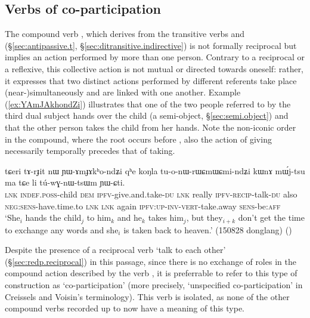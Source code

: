 \subsection{Verbs of co-participation} \label{sec:co.participation} 
The compound verb , which derives from the transitive verbs  and  (§\ref{sec:antipassive.t}, §\ref{sec:ditransitive.indirective}) is not formally reciprocal but implies an action performed by more than one person. Contrary to a reciprocal or a reflexive, this collective action is not mutual or directed towards oneself: rather, it expresses that two distinct actions performed by different referents take place (near-)simultaneously and are linked with one another. Example (\ref{ex:YAmJAkhondZi}) illustrates that one of the two people referred to by the third dual subject hands over the child (a semi-object, §\ref{sec:semi.object}) and that the other person takes the child from her hands. Note the non-iconic order in the compound, where  the root  occurs before , also the action of giving necessarily temporally precedes that of taking.

\begin{exe}
\ex \label{ex:YAmJAkhondZi}
\gll  tɕeri tɤ-rɟit nɯ ɲɯ-ɤmɟɤkʰo-ndʑi qʰe koŋla tu-o-nɯ-rɯɕmɯ\redp{}ɕmi-ndʑi kɯnɤ mɯ́j-tsu ma tɕe li tú-wɣ-nɯ-tsɯm ɲɯ-ɕti. \\
\textsc{lnk} \textsc{indef}.\textsc{poss}-child \textsc{dem} \textsc{ipfv}-give.and.take-\textsc{du} \textsc{lnk} really \textsc{ipfv}-\textsc{recip}-talk-\textsc{du} also \textsc{neg}:\textsc{sens}-have.time.to \textsc{lnk} \textsc{lnk} again \textsc{ipfv}:\textsc{up}-\textsc{inv}-\textsc{vert}-take.away \textsc{sens}-be:\textsc{aff} \\
\glt `She$_i$ hands the child$_j$ to him$_k$ and he$_k$ takes him$_j$, but they$_{i+k}$ don't get the time to exchange any words and she$_i$ is taken back to heaven.' (150828 donglang)
()
\end{exe}

Despite the presence of a reciprocal verb  `talk to each other' (§\ref{sec:redp.reciprocal}) in this passage, since there is no exchange of roles in the compound action described by the verb , it is preferrable to refer to this type of construction as `co-participation' (more precisely, `unspecified co-participation' in Creissels and Voisin's \citeyear{creissels08coparticipation} terminology). This verb is isolated, as none of the other compound verbs recorded up to now have a meaning of this type.

